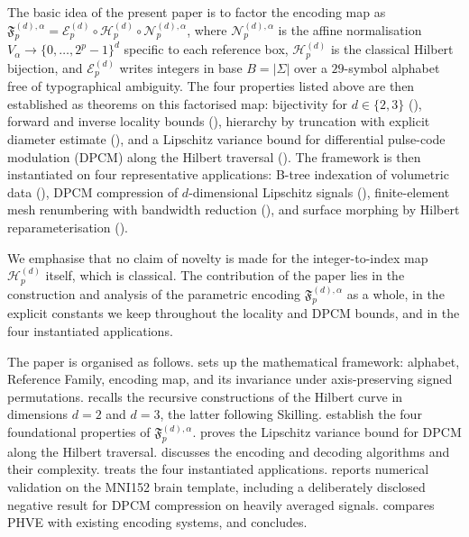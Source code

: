 \documentclass[11pt,a4paper]{article}
\theoremstyle{plain}
\theoremstyle{definition}
\theoremstyle{remark}
\begin{document}
The basic idea of the present paper is to factor the encoding map as
$\mathfrak{F}_p^{(d),\alpha} = \mathcal{E}_p^{(d)} \circ
\mathcal{H}_p^{(d)} \circ \mathcal{N}_p^{(d),\alpha}$, where
$\mathcal{N}_p^{(d),\alpha}$ is the affine normalisation
$V_\alpha \to \{0,\dots,2^p-1\}^d$ specific to each reference box,
$\mathcal{H}_p^{(d)}$ is the classical Hilbert bijection, and
$\mathcal{E}_p^{(d)}$ writes integers in base $B = |\Sigma|$ over a
$29$-symbol alphabet free of typographical ambiguity. The four
properties listed above are then established as theorems on this
factorised map: bijectivity for $d\in\{2,3\}$ (),
forward and inverse locality bounds (), hierarchy
by truncation with explicit diameter estimate (),
and a Lipschitz variance bound for differential pulse-code modulation
(DPCM) along the Hilbert traversal (). The framework
is then instantiated on four representative applications: B-tree
indexation of volumetric data (), DPCM compression of
$d$-dimensional Lipschitz signals (), finite-element
mesh renumbering with bandwidth reduction (), and
surface morphing by Hilbert reparameterisation
().

We emphasise that no claim of novelty is made for the integer-to-index
map $\mathcal{H}_p^{(d)}$ itself, which is classical. The contribution
of the paper lies in the construction and analysis of the parametric
encoding $\mathfrak{F}_p^{(d),\alpha}$ as a whole, in the explicit
constants we keep throughout the locality and DPCM bounds, and in the
four instantiated applications.

The paper is organised as follows.  sets up the
mathematical framework: alphabet, Reference Family, encoding map, and
its invariance under axis-preserving signed permutations.
 recalls the recursive constructions of the Hilbert
curve in dimensions $d=2$ and $d=3$, the latter following Skilling.
 establish
the four foundational properties of $\mathfrak{F}_p^{(d),\alpha}$.
 proves the Lipschitz variance bound for DPCM along
the Hilbert traversal.  discusses the encoding
and decoding algorithms and their complexity. 
treats the four instantiated applications. 
reports numerical validation on the MNI152 brain template, including
a deliberately disclosed negative result for DPCM compression on
heavily averaged signals.  compares PHVE with
existing encoding systems, and  concludes.
\end{document}
